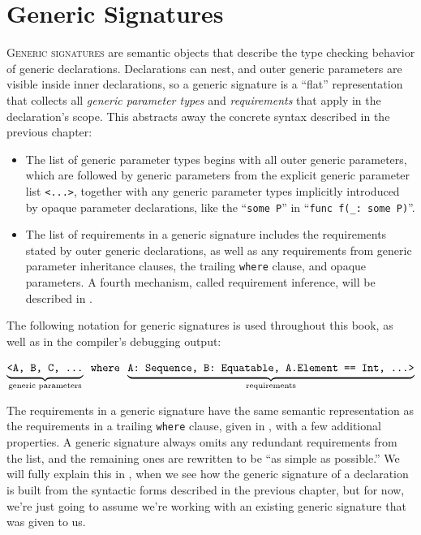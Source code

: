 \documentclass[../generics]{subfiles}
\begin{document}
\chapter{Generic Signatures}\label{chap:generic signatures}

\lettrine{G}{eneric signatures} are semantic objects that describe the type checking behavior of generic declarations. Declarations can nest, and outer generic parameters are visible inside inner declarations, so a generic signature is a ``flat'' representation that collects all \emph{generic parameter types} and \emph{requirements} that apply in the declaration's scope. This abstracts away the concrete syntax described in the previous chapter:
\begin{itemize}
\item The list of generic parameter types begins with all outer generic parameters, which are followed by generic parameters from the explicit generic parameter list \texttt{<...>}, together with any generic parameter types implicitly introduced by opaque parameter declarations, like the ``\texttt{some P}'' in ``\verb|func f(_: some P)|''.
\item The list of requirements in a generic signature includes the requirements stated by outer generic declarations, as well as any requirements from generic parameter inheritance clauses, the trailing \texttt{where} clause, and opaque parameters. A fourth mechanism, called requirement inference, will be described in .
\end{itemize}

The following notation for generic signatures is used throughout this book, as well as in the compiler's debugging output:
\begin{ceqn}
\[\underbrace{\mathstrut\texttt{<A, B, C, ...}}_{\text{generic parameters}}\texttt{ where }\underbrace{\mathstrut\texttt{A:\ Sequence, B:\ Equatable, A.Element == Int, ...>}}_{\text{requirements}}\]
\end{ceqn}

The requirements in a generic signature have the same semantic representation as the requirements in a trailing \texttt{where} clause, given in , with a few additional properties. A generic signature always omits any redundant requirements from the list, and the remaining ones are rewritten to be ``as simple as possible.'' We will fully explain this in , when we see how the generic signature of a declaration is built from the syntactic forms described in the previous chapter, but for now, we're just going to assume we're working with an existing generic signature that was given to us.
\end{document}
